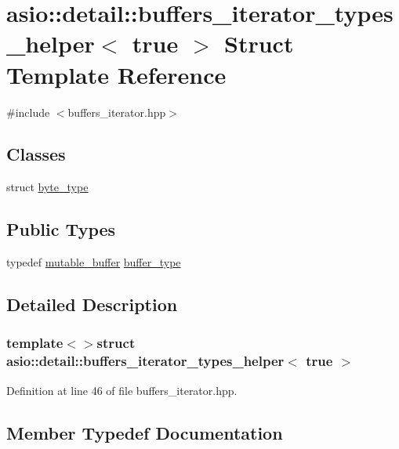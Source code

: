 \hypertarget{structasio_1_1detail_1_1buffers__iterator__types__helper_3_01true_01_4}{}\section{asio\+:\+:detail\+:\+:buffers\+\_\+iterator\+\_\+types\+\_\+helper$<$ true $>$ Struct Template Reference}
\label{structasio_1_1detail_1_1buffers__iterator__types__helper_3_01true_01_4}


{\ttfamily \#include $<$buffers\+\_\+iterator.\+hpp$>$}

\subsection*{Classes}
\begin{DoxyCompactItemize}
\item 
struct \hyperlink{structasio_1_1detail_1_1buffers__iterator__types__helper_3_01true_01_4_1_1byte__type}{byte\+\_\+type}
\end{DoxyCompactItemize}
\subsection*{Public Types}
\begin{DoxyCompactItemize}
\item 
typedef \hyperlink{classasio_1_1mutable__buffer}{mutable\+\_\+buffer} \hyperlink{structasio_1_1detail_1_1buffers__iterator__types__helper_3_01true_01_4_afadfeb16c850d47114205f7d4b671bd5}{buffer\+\_\+type}
\end{DoxyCompactItemize}


\subsection{Detailed Description}
\subsubsection*{template$<$$>$struct asio\+::detail\+::buffers\+\_\+iterator\+\_\+types\+\_\+helper$<$ true $>$}



Definition at line 46 of file buffers\+\_\+iterator.\+hpp.



\subsection{Member Typedef Documentation}
\hypertarget{structasio_1_1detail_1_1buffers__iterator__types__helper_3_01true_01_4_afadfeb16c850d47114205f7d4b671bd5}{}

